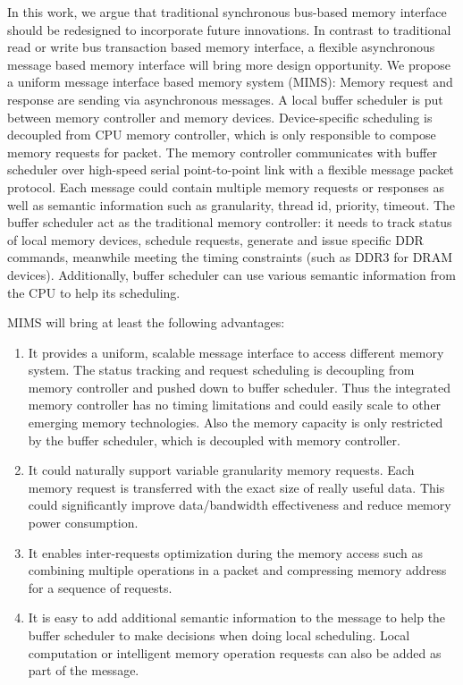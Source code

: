 \documentclass[pageno]{jpaper}
\begin{document}
In this work, we argue that traditional synchronous bus-based memory interface should be redesigned to incorporate future innovations. In contrast to traditional read or write bus transaction based memory interface, a flexible asynchronous message based memory interface will bring more design opportunity. We propose a uniform message interface based memory system (MIMS): Memory request and response are sending via asynchronous messages. A local buffer scheduler is put between memory controller and memory devices. Device-specific scheduling is decoupled from CPU memory controller, which is only responsible to compose memory requests for packet. The memory controller communicates with buffer scheduler over high-speed serial point-to-point link with a flexible message packet protocol. Each message could contain multiple memory requests or responses as well as semantic information such as granularity, thread id, priority, timeout. The buffer scheduler act as the traditional memory controller: it needs to track status of local memory devices, schedule requests, generate and issue specific DDR commands, meanwhile meeting the timing constraints (such as DDR3 for DRAM devices). Additionally, buffer scheduler can use various semantic information from the CPU to help its scheduling.





MIMS will bring at least the following advantages:

\begin{enumerate}
\item It provides a uniform, scalable message interface to access different memory system. The status tracking and request scheduling is decoupling from memory controller and pushed down to buffer scheduler. Thus the integrated memory controller has no timing limitations and could easily scale to other emerging memory technologies. Also the memory capacity is only restricted by the buffer scheduler, which is decoupled with memory controller.
\item It could naturally support variable granularity memory requests. Each memory request is transferred with  the exact size of really useful data. This could significantly improve data/bandwidth effectiveness and reduce memory power consumption.
\item It enables inter-requests optimization during the memory access such as combining multiple operations in a packet and compressing memory address for a sequence of requests.
\item It is easy to add additional semantic information to the message to help the buffer scheduler to make decisions when doing local scheduling. Local computation or intelligent memory operation requests can also be added as part of the message.
\end{enumerate}
\end{document}
